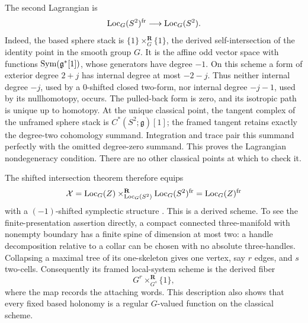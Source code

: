 The second Lagrangian is
\[
       \operatorname{Loc}_G(S^2)^{\mathrm{fr}}\longrightarrow\operatorname{Loc}_G(S^2).
\]
Indeed, the based sphere stack is
\(\{1\}\mathbin{\times^{\mathbf R}_G}\{1\}\), the derived
self-intersection of the identity point in the smooth group \(G\).
It is the affine odd vector space with functions
\(\operatorname{Sym}(\mathfrak g^*[1])\), whose generators have degree \(-1\).
On this scheme a form of exterior degree \(2+j\) has internal degree at
most \(-2-j\).  Thus neither internal degree \(-j\), used by a
\(0\)-shifted closed two-form, nor internal degree \(-j-1\), used by its
nullhomotopy, occurs.  The pulled-back form is zero, and its isotropic
path is unique up to homotopy.  At the unique classical point, the tangent
complex of the unframed sphere stack is
\(C^*(S^2;\mathfrak g)[1]\); the framed tangent retains exactly the
degree-two cohomology summand.  Integration and trace pair this summand
perfectly with the omitted degree-zero summand.  This proves the
Lagrangian nondegeneracy condition.  There are no other classical points
at which to check it.

The shifted intersection theorem therefore equips
\begin{equation}
\label{eq:framed-filling-intersection}
 \mathcal X
 =\operatorname{Loc}_G(Z)\mathbin{\times^{\mathbf R}_{\operatorname{Loc}_G(S^2)}}
                   \operatorname{Loc}_G(S^2)^{\mathrm{fr}}
 =\operatorname{Loc}_G(Z)^{\mathrm{fr}}
\end{equation}
with a \((-1)\)-shifted symplectic structure
\cite[Theorem~2.9]{PTVV2013}.  This is a derived scheme.  To see the
finite-presentation assertion directly, a compact connected
three-manifold with nonempty boundary has a finite spine of dimension at
most two: a handle decomposition relative to a collar can be chosen
with no absolute three-handles.  Collapsing a maximal tree of its
one-skeleton gives one vertex, say \(r\) edges, and \(s\) two-cells.
Consequently its framed local-system scheme is the derived fiber
\[
                    G^r\mathbin{\times^{\mathbf R}_{G^s}}\{1\},
\]
where the map records the attaching words.  This description also shows
that every fixed based holonomy is a regular \(G\)-valued function on
the classical scheme.

